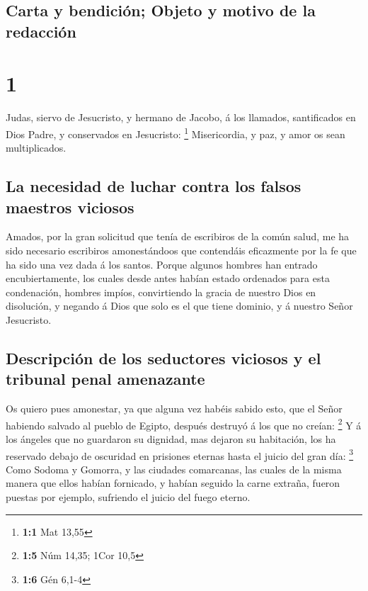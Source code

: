\hypertarget{carta-y-bendiciuxf3n-objeto-y-motivo-de-la-redacciuxf3n}{%
\subsection{Carta y bendición; Objeto y motivo de la
redacción}\label{carta-y-bendiciuxf3n-objeto-y-motivo-de-la-redacciuxf3n}}

\hypertarget{section}{%
\section{1}\label{section}}

 Judas, siervo de Jesucristo, y hermano de Jacobo, á los
llamados, santificados en Dios Padre, y conservados en Jesucristo:
\footnote{\textbf{1:1} Mat 13,55}  Misericordia, y paz, y
amor os sean multiplicados.

\hypertarget{la-necesidad-de-luchar-contra-los-falsos-maestros-viciosos}{%
\subsection{La necesidad de luchar contra los falsos maestros
viciosos}\label{la-necesidad-de-luchar-contra-los-falsos-maestros-viciosos}}

 Amados, por la gran solicitud que tenía de escribiros de
la común salud, me ha sido necesario escribiros amonestándoos que
contendáis eficazmente por la fe que ha sido una vez dada á los santos.
 Porque algunos hombres han entrado encubiertamente, los
cuales desde antes habían estado ordenados para esta condenación,
hombres impíos, convirtiendo la gracia de nuestro Dios en disolución, y
negando á Dios que solo es el que tiene dominio, y á nuestro Señor
Jesucristo.

\hypertarget{descripciuxf3n-de-los-seductores-viciosos-y-el-tribunal-penal-amenazante}{%
\subsection{Descripción de los seductores viciosos y el tribunal penal
amenazante}\label{descripciuxf3n-de-los-seductores-viciosos-y-el-tribunal-penal-amenazante}}

 Os quiero pues amonestar, ya que alguna vez habéis sabido
esto, que el Señor habiendo salvado al pueblo de Egipto, después
destruyó á los que no creían: \footnote{\textbf{1:5} Núm 14,35; 1Cor
  10,5}  Y á los ángeles que no guardaron su dignidad, mas
dejaron su habitación, los ha reservado debajo de oscuridad en prisiones
eternas hasta el juicio del gran día: \footnote{\textbf{1:6} Gén 6,1-4}
 Como Sodoma y Gomorra, y las ciudades comarcanas, las
cuales de la misma manera que ellos habían fornicado, y habían seguido
la carne extraña, fueron puestas por ejemplo, sufriendo el juicio del
fuego eterno.

